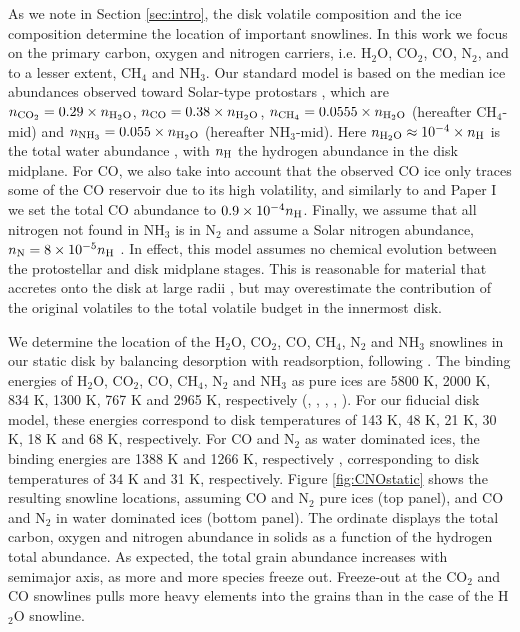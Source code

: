 \documentclass[apj]{emulateapj}
\begin{document}
As we note in Section \ref{sec:intro}, the disk volatile composition and the ice composition determine the location of important snowlines. In this work we focus on the primary carbon, oxygen and nitrogen carriers, i.e. H$_2$O, CO$_2$, CO, N$_2$, and to a lesser extent, CH$_4$ and NH$_3$. %
Our standard model is based on the median ice abundances observed toward Solar-type protostars \citep{oberg11a}, which are $n_{\rm CO_2}=0.29 \times n_{\rm H_2O}$, $n_{\rm CO}=0.38 \times n_{\rm H_2O}$, $n_{\rm CH_4}=0.0555 \times n_{\rm H_2O}$ (hereafter CH$_4$-mid) and $n_{\rm NH_3}=0.055 \times n_{\rm H_2O}$ (hereafter NH$_3$-mid). Here $n_{\rm H_2O} \approx 10^{-4} \times n_{\rm H}$ is the total water abundance \citep{vandishoeck06}, with $n_{\rm H}$ the hydrogen abundance in the disk midplane. For CO, we also take into account that the observed CO ice only traces some of the CO reservoir due to its high volatility, and similarly to \citet{oberg11} and Paper I we set the total CO abundance to $0.9 \times 10^{-4} n_{\rm H}$. Finally, we assume that all nitrogen not found in NH$_3$ is in N$_2$ and assume a Solar nitrogen abundance, $n_{\rm N}=8 \times 10^{-5} n_{\rm H}$ \citep{lodders03}. In effect, this model assumes no chemical evolution between the protostellar and disk midplane stages. This is reasonable for material that accretes onto the disk at large radii \citep{visser09}, but may overestimate the contribution of the original volatiles to the total volatile budget in the innermost disk. 

We determine the location of the H$_2$O, CO$_2$, CO, CH$_4$, N$_2$ and NH$_3$ snowlines in our static disk by balancing desorption with readsorption, following \citet{hollenbach09}. The binding energies of H$_2$O, CO$_2$, CO, CH$_4$, N$_2$ and NH$_3$ as pure ices are 5800 K, 2000 K, 834 K, 1300 K, 767 K and 2965 K, respectively (\citealt{fraser01}, \citealt{collings04}, \citealt{fayolle16}, \citealt{garrod06}, \citealt{martin14}). For our fiducial disk model, these energies correspond to disk temperatures of 143 K, 48 K, 21 K, 30 K, 18 K and 68 K, respectively. For CO and N$_2$ as water dominated ices, the binding energies are 1388 K and 1266 K, respectively \citep{fayolle16}, corresponding to disk temperatures of 34 K and 31 K, respectively. Figure \ref{fig:CNOstatic} shows the resulting snowline locations, assuming CO and N$_2$ pure ices (top panel), and CO and N$_2$ in water dominated ices (bottom panel). The ordinate displays the total carbon, oxygen and nitrogen abundance in solids as a function of the hydrogen total abundance.  As expected, the total grain abundance increases with semimajor axis, as more and more species freeze out. Freeze-out at the CO$_2$ and CO snowlines pulls more heavy elements into the grains than in the case of the H$_2$O snowline.  %
\end{document}
